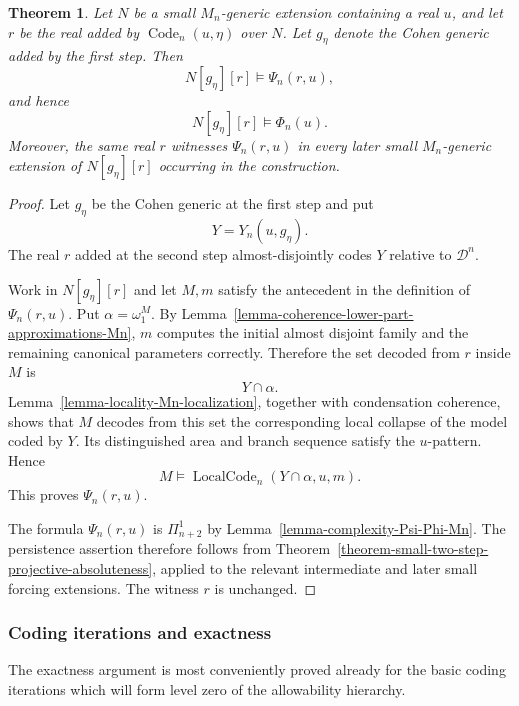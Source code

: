 \documentclass[a4paper,11pt]{article}
\newtheorem{theorem}{Theorem}[section]
\begin{document}
\begin{theorem}
\label{theorem-correctness-persistence-Code-Mn}
Let $N$ be a small $M_n$-generic extension containing a real $u$, and let
$r$ be the real added by $\operatorname{Code}_n(u,\eta)$ over $N$.  Let $g_\eta$ denote the Cohen generic added by the first step.  Then
\[
   N[g_\eta][r]\models\Psi_n(r,u),
\]
and hence
\[
   N[g_\eta][r]\models\Phi_n(u).
\]
Moreover, the same real $r$ witnesses $\Psi_n(r,u)$ in every later small
$M_n$-generic extension of $N[g_\eta][r]$ occurring in the construction.
\end{theorem}

\begin{proof}
Let $g_\eta$ be the Cohen generic at the first step and put
\[
   Y=Y_n(u,g_\eta).
\]
The real $r$ added at the second step almost-disjointly codes $Y$ relative to
$\mathcal D^n$.

Work in $N[g_\eta][r]$ and let $M,m$ satisfy the antecedent in the
definition of $\Psi_n(r,u)$.  Put $\alpha=\omega_1^M$.  By
Lemma~\ref{lemma-coherence-lower-part-approximations-Mn}, $m$ computes the
initial almost disjoint family and the remaining canonical parameters
correctly.  Therefore the set decoded from $r$ inside $M$ is
\[
   Y\cap\alpha.
\]
Lemma~\ref{lemma-locality-Mn-localization}, together with condensation
coherence, shows that $M$ decodes from this set the corresponding local
collapse of the model coded by $Y$.  Its distinguished area and branch
sequence satisfy the $u$-pattern.  Hence
\[
   M\models
   \operatorname{LocalCode}_n(Y\cap\alpha,u,m).
\]
This proves $\Psi_n(r,u)$.

The formula $\Psi_n(r,u)$ is $\Pi^1_{n+2}$ by
Lemma~\ref{lemma-complexity-Psi-Phi-Mn}.  The persistence assertion therefore
follows from
Theorem~\ref{theorem-small-two-step-projective-absoluteness}, applied to the
relevant intermediate and later small forcing extensions.  The witness $r$
is unchanged.
\end{proof}

\subsubsection*{Coding iterations and exactness}

The exactness argument is most conveniently proved already for the basic
coding iterations which will form level zero of the allowability hierarchy.
\end{document}
